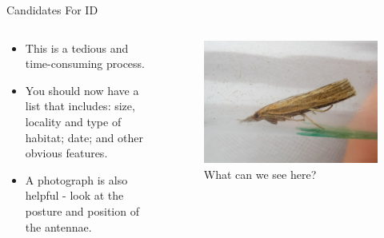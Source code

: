 \documentclass[
  ignorenonframetext,
]{beamer}
\providecommand{\tightlist}{%
  \setlength{\itemsep}{0pt}\setlength{\parskip}{0pt}}
\begin{document}
\begin{frame}{Candidates For ID}
\protect\hypertarget{candidates-for-id}{}
\begin{columns}[T]
\begin{column}{0.5\textwidth}
\begin{itemize}
\tightlist
\item
  This is a tedious and time-consuming process.
\item
  You should now have a list that includes: size, locality and type of
  habitat; date; and other obvious features.
\item
  A photograph is also helpful - look at the posture and position of the
  antennae.
\end{itemize}
\end{column}

\begin{column}{0.5\textwidth}
\begin{figure}
\centering
\includegraphics{./images/Pcontaminella-PML-2021.jpg}
\caption{What can we see here?}
\end{figure}
\end{column}
\end{columns}
\end{frame}
\end{document}
